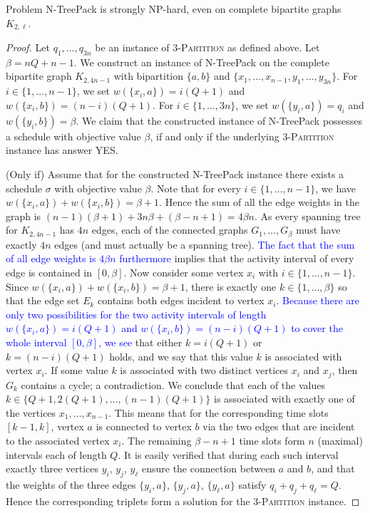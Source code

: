\documentclass[runningheads]{llncs}
\newcommand{\set}[1]{\{ #1 \}}
\newcommand{\fromto}[2]{\set{#1, \ldots, #2}}
\newcommand{\xxxNTP}{{\sc N-TreePack}}
\newcommand{\lasse}[1]{\textcolor{blue}{#1}}
\begin{document}
\begin{theorem}
\label{thm:hardness_complete_bipartite}
Problem {\xxxNTP} is strongly NP-hard, even on complete bipartite graphs $K_{2,\ell}$. 
\end{theorem}
\begin{proof}
Let $q_1,\ldots,q_{3n}$ be an instance of \textsc{3-Partition} as defined above. 
Let $\beta= nQ + n - 1$. 
We construct an instance of {\xxxNTP} on the complete bipartite graph $K_{2,4n-1}$ with bipartition
$\set{a,b}$ and $\set{x_1, \ldots, x_{n-1}, y_1, \ldots, y_{3n}}$. 
For $i\in\{1,\ldots,n-1\}$, we set $w(\set{x_i,a})= i(Q + 1)$ and $w(\set{x_i,b})= (n-i)(Q+1)$. 
For $i\in\{1,\ldots,3n\}$,  we set $w(\set{y_i,a})= q_i$      and $w(\set{y_i,b})= \beta$. 
We claim that the constructed instance of {\xxxNTP} possesses a schedule with objective value $\beta$, 
if and only if the underlying \textsc{3-Partition} instance has answer YES.

(Only if) Assume that for the constructed {\xxxNTP} instance there exists a schedule $\sigma$ 
with objective value $\beta$. 
Note that for every $i \in \{1,\dots,n-1\}$, we have $w(\set{x_i,a}) +w(\set{x_i,b}) = \beta+1$. 
Hence the sum of all the edge weights in the graph is $(n-1)(\beta+1) +3n\beta +(\beta-n+1) = 4\beta n$. 
As every spanning tree for $K_{2, 4n-1}$ has $4n$ edges, each of the connected graphs $G_1,\dots,G_\beta$ 
must have exactly $4n$ edges (and must actually be a spanning tree). \lasse{The fact that the sum of all edge weights is $4\beta n$ furthermore} implies that the activity interval of every edge is contained in $[0, \beta]$.
Now consider some vertex $x_i$ with $i\in\{1,\dots,n-1\}$. 
Since $w(\set{x_i,a}) + w(\set{x_i,b})=\beta+1$, there is exactly one $k\in\fromto{1}{\beta}$ so 
that the edge set $E_k$ contains both edges incident to vertex $x_i$. 
\lasse{Because there are only two possibilities for the two activity intervals of length $w(\set{x_i,a}) = i(Q+1)$ and $w(\set{x_i,b}) = (n-i)(Q+1)$ to cover the whole interval $[0, \beta]$, we see} that either $k=i(Q+1)$ or $k=(n-i)(Q+1)$ holds, and we say that this value $k$ 
is associated with vertex $x_i$.
If some value $k$ is associated with two distinct vertices $x_i$ and $x_j$, then $G_k$ contains 
a cycle; a contradiction.
We conclude that each of the values $k\in\set{Q+1,2(Q+1),\ldots,(n-1)(Q+1)}$ is associated with
exactly one of the vertices $x_1,\ldots,x_{n-1}$.
This means that for the corresponding time slots $[k-1,k]$, vertex $a$ is connected to vertex $b$
via the two edges that are incident to the associated vertex $x_i$.
The remaining $\beta-n+1$ time slots form $n$ (maximal) intervals each of length $Q$.
It is easily verified that during each such interval exactly three vertices $y_i$, $y_j$, $y_{\ell}$
ensure the connection between $a$ and $b$, and that the weights of the three edges $\{y_i,a\}$,
$\{y_j,a\}$, $\{y_{\ell},a\}$ satisfy $q_i+q_j+q_{\ell}=Q$.
Hence the corresponding triplets form a solution for the \textsc{3-Partition} instance.


\end{proof}
\end{document}
